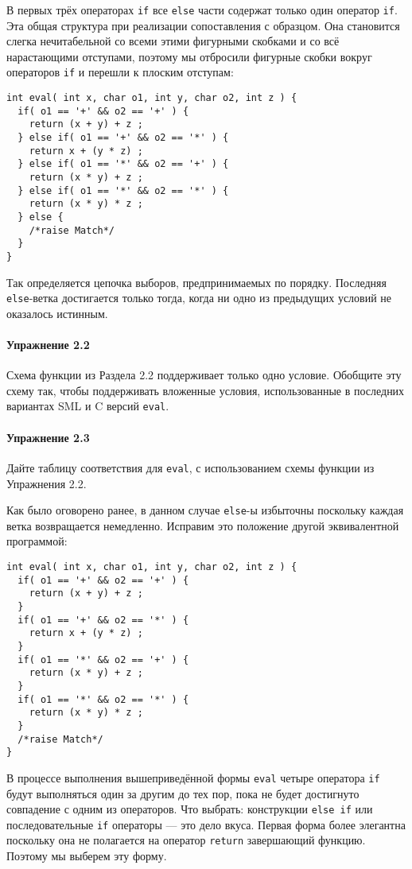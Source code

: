 В первых трёх операторах \lstinline|if| все \lstinline|else| части содержат только один оператор \lstinline|if|. Эта общая структура при реализации сопоставления с образцом. Она становится слегка нечитабельной со всеми этими фигурными скобками и со всё нарастающими отступами, поэтому мы отбросили фигурные скобки вокруг операторов \lstinline|if| и перешли к плоским отступам:

\begin{lstlisting}
int eval( int x, char o1, int y, char o2, int z ) {
  if( o1 == '+' && o2 == '+' ) {
    return (x + y) + z ;
  } else if( o1 == '+' && o2 == '*' ) {
    return x + (y * z) ;
  } else if( o1 == '*' && o2 == '+' ) {
    return (x * y) + z ;
  } else if( o1 == '*' && o2 == '*' ) {
    return (x * y) * z ;
  } else {
    /*raise Match*/
  }
}
\end{lstlisting}

Так определяется цепочка выборов, предпринимаемых по порядку. Последняя \lstinline|else|-ветка достигается только тогда, когда ни одно из предыдущих условий не оказалось истинным.

\paragraph{Упражнение 2.2} Схема функции из Раздела 2.2 поддерживает только одно условие. Обобщите эту схему так, чтобы поддерживать вложенные условия, использованные в последних вариантах SML и C версий \lstinline|eval|.

\paragraph{Упражнение 2.3} Дайте таблицу соответствия для \lstinline|eval|, с использованием схемы функции из Упражнения 2.2.

Как было оговорено ранее, в данном случае \lstinline|else|-ы избыточны поскольку каждая ветка возвращается немедленно. Исправим это положение другой эквивалентной программой:

\begin{lstlisting}
int eval( int x, char o1, int y, char o2, int z ) {
  if( o1 == '+' && o2 == '+' ) {
    return (x + y) + z ;
  }
  if( o1 == '+' && o2 == '*' ) {
    return x + (y * z) ;
  }
  if( o1 == '*' && o2 == '+' ) {
    return (x * y) + z ;
  }
  if( o1 == '*' && o2 == '*' ) {
    return (x * y) * z ;
  }
  /*raise Match*/
}
\end{lstlisting}

В процессе выполнения вышеприведённой формы \lstinline|eval| четыре оператора \lstinline|if| будут выполняться один за другим до тех пор, пока не будет достигнуто совпадение с одним из операторов. Что выбрать: конструкции \lstinline|else if| или последовательные \lstinline|if| операторы --- это дело вкуса. Первая форма более элегантна поскольку она не полагается на оператор \lstinline|return| завершающий функцию. Поэтому мы выберем эту форму.

